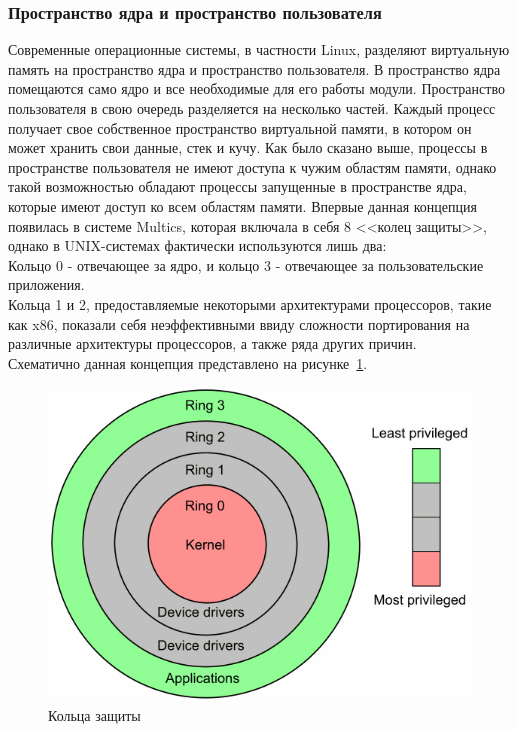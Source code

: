 \subsubsection{Пространство ядра и пространство пользователя}\label{subsec:----}
Современные операционные системы, в частности Linux, разделяют виртуальную память на пространство ядра и пространство пользователя.
В пространство ядра помещаются само ядро и все необходимые для его работы модули.
Пространство пользователя в свою очередь разделяется на несколько частей.
Каждый процесс получает свое собственное пространство виртуальной памяти, в котором он может хранить свои данные, стек и кучу.
Как было сказано выше, процессы в пространстве пользователя не имеют доступа к чужим областям памяти, однако такой возможностью обладают процессы запущенные в пространстве ядра, которые имеют доступ ко всем областям памяти.
Впервые данная концепция появилась в системе Multics, которая включала в себя 8 <<колец защиты>>\footnotemark, однако в UNIX-системах фактически используются лишь два:
\\
Кольцо 0 - отвечающее за ядро, и кольцо 3 - отвечающее за пользовательские приложения.
\\
Кольца 1 и 2, предоставляемые некоторыми архитектурами процессоров, такие как x86, показали себя неэффективными ввиду сложности портирования на различные архитектуры процессоров, а также ряда других причин.
\\
Схематично данная концепция представлено на рисунке~\ref{fig:rings}.


\begin{figure}[h]
    \centering
    \includegraphics[width=\textwidth]{inc/img/rings}
    \caption{Кольца защиты}
    \label{fig:rings}
\end{figure}

